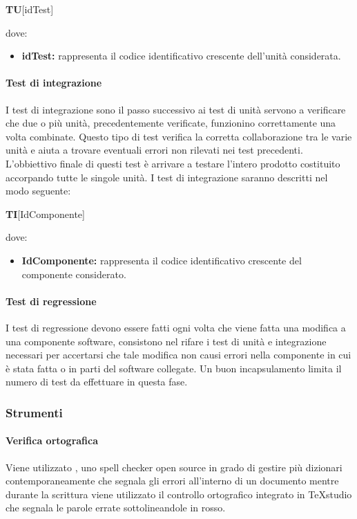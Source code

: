 \centerline{\textbf{TU}[idTest]}

dove:
\begin{itemize}
	\item \textbf{idTest:} rappresenta il codice identificativo crescente dell’unità considerata.
\end{itemize}
\paragraph{Test di integrazione} \Spazio
I test di integrazione sono il passo successivo ai test di unità servono a verificare che due o più unità, precedentemente verificate, funzionino correttamente una volta combinate.
Questo tipo di test verifica la corretta collaborazione tra le varie unità e aiuta a trovare eventuali errori non rilevati nei test precedenti.
L'obbiettivo finale di questi test è arrivare a testare l'intero prodotto costituito accorpando tutte le singole unità.\newline
I test di integrazione saranno descritti nel modo seguente: \Spazio
\centerline{\textbf{TI}[IdComponente]}

dove:
\begin{itemize}
	\item \textbf{IdComponente:} rappresenta il codice identificativo crescente del componente considerato.
\end{itemize}

\paragraph{Test di regressione}	\Spazio
I test di regressione devono essere fatti ogni volta che viene fatta una modifica a una componente software, consistono nel rifare i test di unità e integrazione necessari per accertarsi che tale modifica non causi errori nella componente in cui è stata fatta o in parti del software collegate.
Un buon incapsulamento limita il numero di test da effettuare in questa fase.
\subsubsection{Strumenti}
\paragraph{Verifica ortografica} \Spazio
Viene utilizzato , uno spell checker open source in grado di gestire più dizionari contemporaneamente che segnala gli errori all'interno di un documento mentre durante la scrittura viene utilizzato il controllo ortografico integrato in TeXstudio che segnala le parole errate sottolineandole in rosso.
